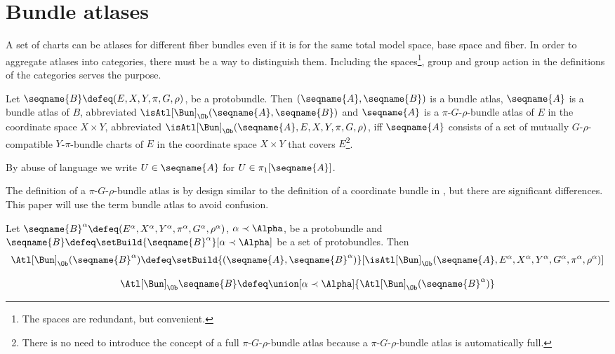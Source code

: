 \documentclass{article}
\begin{document}
\section{Bundle atlases}
\label{sec:bunatlases}
A set of charts can be atlases for different fiber bundles even if it is
for the same total model space, base space and fiber. In order to
aggregate atlases into categories, there must be a way to distinguish
them. Including the spaces\footnote{
The spaces are redundant, but convenient.},
group and group action in the definitions of the categories serves the
purpose.

\begin{definition}
\label{def:BunAtl}
Let $\seqname{B} \defeq (E, X, Y, \pi, G, \rho)$, be a protobundle. Then
$(\seqname{A},\seqname{B})$ is a bundle atlas, $\seqname{A}$ is a bundle
atlas of $B$, abbreviated $\isAtl[\Bun]_\Ob(\seqname{A}, \seqname{B})$
and $\seqname{A}$ is a $\pi$-$G$-$\rho$-bundle atlas of $E$ in the
coordinate space $X \times Y$, abbreviated
$\isAtl[\Bun]_\Ob(\seqname{A}, E, X, Y, \pi, G, \rho)$, iff
$\seqname{A}$ consists of a set of mutually $G$-$\rho$-compatible
$Y$-$\pi$-bundle charts of $E$ in the coordinate space $X \times Y$ that
covers $E$\footnote{
  There is no need to introduce the concept of a full
  $\pi$-$G$-$\rho$-bundle atlas because a $\pi$-$G$-$\rho$-bundle
  atlas is automatically full.
}.

By abuse of language we write $U \in \seqname{A}$ for
$U \in \pi_1[\seqname{A}]$.

\begin{remark}
The definition of a $\pi$-$G$-$\rho$-bundle atlas is by design similar
to the definition of a coordinate bundle in \cite[p.~7]{TopFib}, but
there are significant differences. This paper will use the term bundle
atlas to avoid confusion.
\end{remark}

Let
$
  \seqname{B}^\alpha \defeq
  (E^\alpha, X^\alpha, Y^\alpha, \pi^\alpha, G^\alpha, \rho^\alpha)
$,
$\alpha \prec \Alpha$, be a protobundle and
$\seqname{B} \defeq \setBuild{{\seqname{B}^\alpha}}[\alpha \prec \Alpha]$
be a set of protobundles.
Then
\begin{multline}
\Atl[\Bun]_\Ob(\seqname{B}^\alpha) \defeq
  \setBuild
  {{
    (
      \seqname{A},
      \seqname{B}^\alpha
    )
  }}%
  [
    {{
      \isAtl[\Bun]_\Ob
        (
          \seqname{A},
          E^\alpha,
          X^\alpha,
          Y^\alpha,
          G^\alpha,
          \pi^\alpha,
          \rho^\alpha
        )
    }}
  ]
\end{multline}

\begin{equation}
\Atl[\Bun]_\Ob \seqname{B} \defeq
  \union[\alpha \prec \Alpha]{\Atl[\Bun]_\Ob(\seqname{B}^\alpha)}
\end{equation}
\end{definition}
\end{document}
